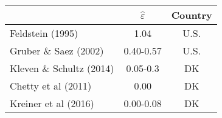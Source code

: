 \begin{tabular}{lcc}
\toprule
{}                        & $\hat{\varepsilon}$ & Country \\
\midrule
Feldstein (1995)          & 1.04                & U.S.    \\
Gruber \& Saez (2002)     & 0.40-0.57           & U.S.    \\
Kleven \& Schultz (2014)  & 0.05-0.3            & DK      \\
Chetty et al (2011)       & 0.00                & DK      \\
Kreiner et al (2016)      & 0.00-0.08           & DK      \\
\bottomrule
\end{tabular}
%     
